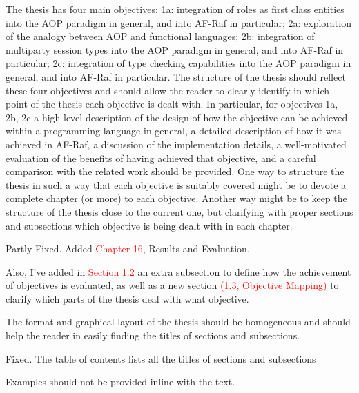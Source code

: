 \documentclass{article}
\newcommand*\R[1]{\textcolor{red}{#1}} %
\newenvironment{them}{\noindent\begingroup\color{blue}}{\endgroup\par}
\begin{document}
\begin{them}

The thesis has four main objectives: 1a: integration of roles as first class
entities into the AOP paradigm in general, and into AF-Raf in particular; 2a:
exploration of the analogy between AOP and functional languages; 2b:
integration of multiparty session types into the AOP paradigm in general, and
into AF-Raf in particular; 2c: integration of type checking capabilities into
the AOP paradigm in general, and into AF-Raf in particular.  The structure of
the thesis should reflect these four objectives and should allow the reader to
clearly identify in which point of the thesis each objective is dealt with. In
particular, for objectives 1a, 2b, 2c a high level description of the design of
how the objective can be achieved within a programming language in general, a
detailed description of how it was achieved in AF-Raf, a discussion of the
implementation details, a well-motivated evaluation of the benefits of having
achieved that objective, and a careful comparison with the related work should
be provided.  One way to structure the thesis in such a way that each objective
is suitably covered might be to devote a complete chapter (or more) to each
objective. Another way might be to keep the structure of the thesis close to
the current one, but clarifying with proper sections and subsections which
objective is being dealt with in each chapter.

\end{them}
Partly Fixed. Added \R{Chapter 16}, Results and Evaluation.

Also, I've added in \R{Section 1.2} an extra subsection to define how the
achievement of objectives is evaluated, as well as a new  section \R{(1.3,
Objective Mapping)} to clarify which parts of the thesis deal with what
objective.

\begin{them}

The format and graphical layout of the thesis should be homogeneous and should
help the reader in easily finding the titles of sections and subsections.

\end{them}
Fixed. The table of contents lists all the titles of sections and subsections

\begin{them}

 Examples should not be provided inline with the text.
\end{them}
\end{document}
